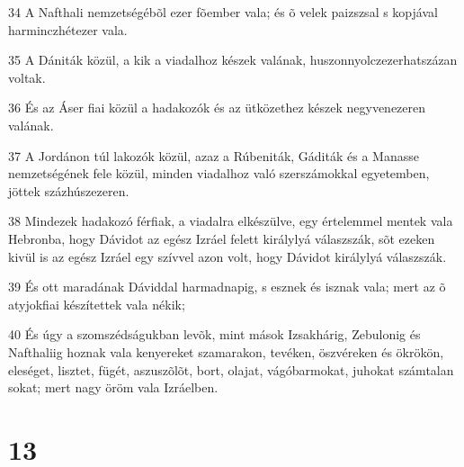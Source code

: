 \par 34 A Nafthali nemzetségébõl ezer fõember vala; és õ velek paizszsal s kopjával harminczhétezer vala.
\par 35 A Dániták közül, a kik a viadalhoz készek valának, huszonnyolczezerhatszázan voltak.
\par 36 És az Áser fiai közül a hadakozók és az ütközethez készek negyvenezeren valának.
\par 37 A Jordánon túl lakozók közül, azaz a Rúbeniták, Gáditák és a Manasse nemzetségének fele közül, minden viadalhoz való szerszámokkal egyetemben, jöttek százhúszezeren.
\par 38 Mindezek hadakozó férfiak, a viadalra elkészülve, egy értelemmel mentek vala Hebronba, hogy Dávidot az egész Izráel felett királylyá válaszszák, sõt ezeken kivül is az egész Izráel egy szívvel azon volt, hogy Dávidot királylyá válaszszák.
\par 39 És ott maradának Dáviddal harmadnapig, s esznek és isznak vala; mert az õ atyjokfiai készítettek vala nékik;
\par 40 És úgy a szomszédságukban levõk, mint mások Izsakhárig, Zebulonig és Nafthaliig hoznak vala kenyereket szamarakon, tevéken, öszvéreken és ökrökön, eleséget, lisztet, fügét, aszuszõlõt, bort, olajat, vágóbarmokat, juhokat számtalan sokat; mert nagy öröm vala Izráelben.

\chapter{13}

